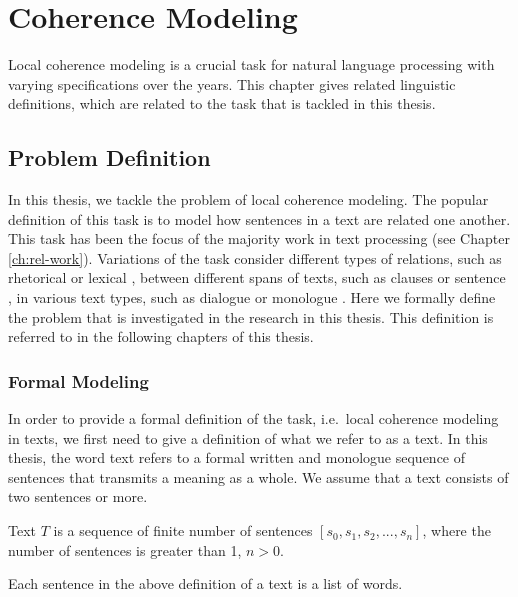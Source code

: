 
\chapter{Coherence Modeling}
\label{ch:coherence}

Local coherence modeling is a crucial task for natural language processing with varying specifications over the years. 
This chapter gives related linguistic definitions, which are related to the task that is tackled in this thesis. 


\section{Problem Definition}
\label{sec:coh-def}

In this thesis, we tackle the problem of local coherence modeling. 
The popular definition of this task is to model how sentences in a text are related one another. 
This task has been the focus of the majority work in text processing (see Chapter \ref{ch:rel-work}). 
Variations of the task consider different types of relations, such as rhetorical \cite{hovyeduard89} or lexical \cite{morris91}, between different spans of texts, such as clauses \cite{strube.col98} or sentence \cite{halliday76}, in various text types, such as dialogue \cite{wangxinhao13} or monologue \cite{barzilay08}. 
Here we formally define the problem that is investigated in the research in this thesis.  
This definition is referred to in the following chapters of this thesis. 

\subsection{Formal Modeling}

In order to provide a formal definition of the task, i.e.\ local coherence modeling in texts, we first need to give a definition of what we refer to as a text. 
In this thesis, the word text refers to a formal written and monologue sequence of sentences that transmits a meaning as a whole.  
We assume that a text consists of two sentences or more.  

\begin{definition}
Text $T$ is a sequence of finite number of sentences $[s_0, s_1, s_2, ..., s_n]$, where the number of sentences is greater than 1, $n>0$.   
\end{definition}

Each sentence in the above definition of a text is a list of words.

